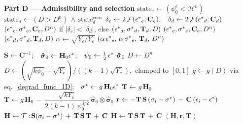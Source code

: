 \documentclass[10pt]{cas-sc}
\begin{document}
\begin{algorithm}[h]
\begin{algorithmic}[1]
		\Statex \textbf{Part D --- Admissibility and selection}
		\State $\mathrm{state}_e \gets (\psi_0^e < \mathcal{H}^n)$
		\State $\mathrm{state}_d \gets (D > D^n)\,\wedge\,\mathrm{state}_d^{\text{conv}}$
		\State $\delta_e \gets 2\,\mathcal{F}(\mbox{$\epsilon^*$}_e;\mathbf{C}_e)$,\ \ $\delta_d \gets 2\,\mathcal{F}(\mbox{$\epsilon^*$}_d;\mathbf{C}_d)$
		\State \Return $(\mbox{$\epsilon^*$}_e,\mbox{$\sigma^*$}_e,\mathbf{C}_e,D^n)$ if $|\delta_e|<|\delta_d|$, else $(\mbox{$\epsilon^*$}_d,\mbox{$\sigma^*$}_d,\mathbf{T}_d,D)$
		\State \Return $(\mbox{$\epsilon^*$}_e,\mbox{$\sigma^*$}_e,\mathbf{C}_e,D^n)$
		\State \Return $(\mbox{$\epsilon^*$}_d,\mbox{$\sigma^*$}_d,\mathbf{T}_d,D)$
		\Else
		\State $\alpha \gets \sqrt{Y_c/Y_e}$
		\State \Return $(\alpha\,\mbox{$\epsilon^*$}_e,\,\alpha\,\mbox{$\sigma^*$}_e,\,\mathbf{T}_d,\,D^n)$ 
		\EndIf
	\end{algorithmic}
	\caption{Material update with branch admissibility (per-Gauss-point)}
	\label{alg:material_update_detailed}
\end{algorithm}

\begin{algorithm}
	\begin{algorithmic}[1]
		\State $\mathbf{S}\gets\mathbf{C}^{-1}$;\ \ $\boldsymbol{\hat\sigma}_0 \gets \mathbf{H}_0\mbox{$\epsilon^*$}$;\ \ $\psi_0 \gets \tfrac12\,\mbox{$\epsilon^*$}\!\cdot\!\boldsymbol{\hat\sigma}_0$
		\State $D \gets D^n$
		\Else
		\State $D \gets (\sqrt{k\psi_0}-\sqrt{Y_c})/((k-1)\sqrt{Y_c})$,\ clamped to $[0,1]$
		\EndIf
		\State $g \gets g(D)$ via eq.~\eqref{degrad_func_1D};\ \ $\mbox{$\sigma^*$} \gets g\,\mathbf{H}_0\mbox{$\epsilon^*$}$
		\State $\mathbf{T} \gets g\,\mathbf{H}_0$ 
		\Else
		\State $\mathbf{T} \gets g\,\mathbf{H}_0\,-\,\dfrac{\sqrt{kY_c}}{2(k-1)\,\psi_0^{3/2}}\,\boldsymbol{\hat\sigma}_0\!\otimes\!\boldsymbol{\hat\sigma}_0$
		\EndIf
		\State $\mathbf{r} \gets -\mathbf{T}\,\mathbf{S}\,(\sigma_i-\mbox{$\sigma^*$})\,-\,\mathbf{C}\,(\epsilon_i-\mbox{$\epsilon^*$})$ 
		\State $\mathbf{H} \gets \mathcal{T}:\!\mathbf{S}(\sigma_i-\mbox{$\sigma^*$})\,+\,\mathbf{T}\,\mathbf{S}\,\mathbf{T}\,+\,\mathbf{C}$
		\Else
		\State $\mathbf{H} \gets \mathbf{T}\,\mathbf{S}\,\mathbf{T}\,+\,\mathbf{C}$
		\EndIf
		\State \Return $(\mathbf{H},\mathbf{r},\mathbf{T})$
		\EndProcedure
	\end{algorithmic}
	\caption{Residual and Hessian assembly for the material update Newton iteration.}
	\label{alg:assemble}
\end{algorithm}
\end{document}
